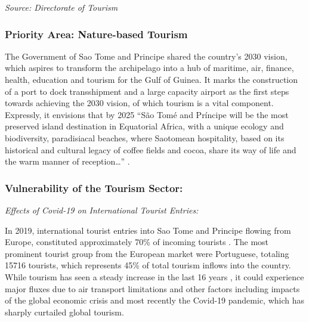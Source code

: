\documentclass[
]{book}
\begin{document}
\emph{Source: Directorate of Tourism }

\hypertarget{priority-area-nature-based-tourism-1}{%
\subsubsection{Priority Area: Nature-based Tourism}\label{priority-area-nature-based-tourism-1}}

The Government of Sao Tome and Principe shared the country's 2030 vision, which aspires to transform the archipelago into a hub of maritime, air, finance, health, education and tourism for the Gulf of Guinea. It marks the construction of a port to dock transshipment and a large capacity airport as the first steps towards achieving the 2030 vision, of which tourism is a vital component. Expressly, it envisions that by 2025 ``São Tomé and Príncipe will be the most preserved island destination in Equatorial Africa, with a unique ecology and biodiversity, paradisiacal beaches, where Saotomean hospitality, based on its historical and cultural legacy of coffee fields and cocoa, share its way of life and the warm manner of reception\ldots{}'' .

\hypertarget{vulnerability-of-the-tourism-sector-1}{%
\subsubsection{\texorpdfstring{\textbf{Vulnerability of the Tourism Sector:}}{Vulnerability of the Tourism Sector:}}\label{vulnerability-of-the-tourism-sector-1}}

\emph{Effects of Covid-19 on International Tourist Entries:}

In 2019, international tourist entries into Sao Tome and Principe flowing from Europe, constituted approximately 70\% of incoming tourists . The most prominent tourist group from the European market were Portuguese, totaling 15716 tourists, which represents 45\% of total tourism inflows into the country. While tourism has seen a steady increase in the last 16 years , it could experience major fluxes due to air transport limitations and other factors including impacts of the global economic crisis and most recently the Covid-19 pandemic, which has sharply curtailed global tourism.
\end{document}
